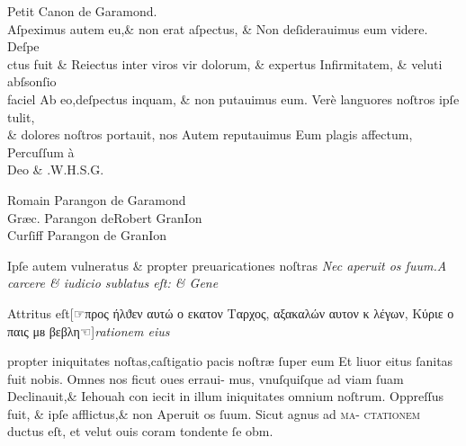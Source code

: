 \documentclass{article}
\newcommand{\threecolumntypefacenames}[3]{\begin{multicols}{3}
		\tiny
		\hfill \qquad \qquad \qquad \qquad #1\hspace*{\fill}\\
		\columnbreak
		\hfill #2\hspace*{\fill}\\
		\columnbreak
		\hfill #3\qquad \qquad \qquad \qquad \hspace*{\fill}
\end{multicols}}
\begin{document}
{\small
\centering
Petit Canon de Garamond.\\
\vspace{-0.5\baselineskip}
\Large
\justifying
Aſpeximus autem eu,\& non erat aſpectus, \& Non deſiderauimus eum videre. Deſpe \\
ctus fuit \& Reiectus inter viros vir dolorum, \& expertus Infirmitatem, \& veluti abſsonſio \\
faciel Ab eo,deſpectus inquam, \& non putauimus eum. Ver\`e languores noſtros ipſe tulit, \\
\& dolores noſtros portauit, nos Autem reputauimus Eum plagis affectum, Percuſſum \`a\\
\centering
Deo \& .\quad  W.\quad H.\quad S.\quad G.\quad \\
\vspace{-\baselineskip}
\threecolumntypefacenames{Romain Parangon de Garamond}{Gr\ae{}c. Parangon deRobert GranIon\quad \quad \quad \quad \quad \quad \quad \quad }{Curſiff Parangon de GranIon}
\vspace*{-\baselineskip}
\scriptsize
\begin{multicols}{2}
	\justifying
	\normalsize
	\justifying
	Ipſe autem vulneratus \& propter preuaricationes noſtras\linebreak
	\columnbreak
	\textit{Nec aperuit os ſuum.A carcere \& iudicio sublatus eſt: \& Gene}
\end{multicols}
\vspace{-1.55\baselineskip}
\normalsize
\justifying
\noindent
Attritus eſt\hfill[\hfill☞\hfill προς  ήλϑεν  αυτώ  ο εκατον Ταρχος,  αξακαλών αυτον κ λέγων, Κύριε ο  παις μᴕ βεβλη\hfill ☜\hfill ]\hfill \textit{rationem eius}
\vspace{-1.05\baselineskip}
\begin{multicols}{2}
	\noindent propter iniquitates noſtas,caſtigatio pacis noſtr\ae{} ſuper eum\linebreak
	Et liuor eitus ſanitas fuit nobis. Omnes nos ficut oues erraui-\linebreak
	mus, vnuſquiſque ad viam ſuam Declinauit,\& Iehouah con\linebreak
	iecit in illum iniquitates omnium noſtrum. Oppreſſus fuit,\linebreak
	\& ipſe afflictus,\& non Aperuit os ſuum. Sicut agnus ad \textsc{ma}-\linebreak
	\textsc{ctationem} ductus eſt, et velut ouis coram tondente ſe obm.\\


\end{multicols}}
\end{document}
